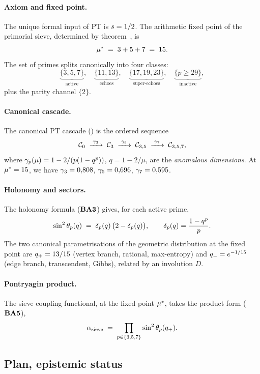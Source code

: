 \paragraph{Axiom and fixed point.} The unique formal input of PT is $s = 1/2$. The arithmetic fixed point of the primorial sieve, determined by theorem~\Tfive, is
\[
\mu^{*} \;=\; 3 + 5 + 7 \;=\; 15.
\]
The set of primes splits canonically into four classes:
\[
\underbrace{\{3, 5, 7\}}_{\text{active}}, \quad
\underbrace{\{11, 13\}}_{\text{echoes}}, \quad
\underbrace{\{17, 19, 23\}}_{\text{super-echoes}}, \quad
\underbrace{\{p \geq 29\}}_{\text{inactive}},
\]
plus the parity channel $\{2\}$.

\paragraph{Canonical cascade.} The canonical PT cascade (\cite[\S{}5]{PT_Article1_Foundations}) is the ordered sequence
\[
\mathcal C_0 \;\xrightarrow{\;\gamma_{3}\;}\; \mathcal C_3
\;\xrightarrow{\;\gamma_{5}\;}\; \mathcal C_{3,5}
\;\xrightarrow{\;\gamma_{7}\;}\; \mathcal C_{3,5,7},
\]
where $\gamma_{p}(\mu) = 1 - 2/(p(1 - q^{p}))$, $q = 1 - 2/\mu$, are the \emph{anomalous dimensions}. At $\mu^{*} = 15$, we have $\gamma_{3} = 0{,}808$, $\gamma_{5} = 0{,}696$, $\gamma_{7} = 0{,}595$.

\paragraph{Holonomy and sectors.} The holonomy formula ($\textbf{BA3}$) gives, for each active prime,
\[
\sin^{2}\theta_{p}(q) \;=\; \delta_p(q)\,\bigl(2 - \delta_p(q)\bigr), \qquad \delta_p(q) = \dfrac{1 - q^{p}}{p}.
\]
The two canonical parametrisations of the geometric distribution at the fixed point are $q_{+} = 13/15$ (vertex branch, rational, max-entropy) and $q_{-} = e^{-1/15}$ (edge branch, transcendent, Gibbs), related by an involution $D$.

\paragraph{Pontryagin product.} The sieve coupling functional, at the fixed point $\mu^{*}$, takes the product form ($\textbf{BA5}$),
\[
\alpha_{\rm sieve} \;=\; \prod_{p \in \{3,5,7\}} \sin^{2}\theta_{p}(q_{+}).
\]

\subsection{Plan, epistemic status}
\label{sec:intro2:plan}

